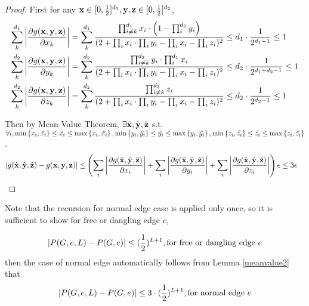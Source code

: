 	\begin{proof}
		First for any ${\bf x} \in [0, \frac{1}{2}]^{d_1} , {\bf y,z} \in [0, \frac{1}{2}]^{d_2}$,
		\begin{align*}
		\sum_k^{d_1} \left\vert \frac{\partial g({\bf x,y,z})}{\partial x_k} \right\vert &= \sum_k^{d_1} \frac{\prod_{i\neq k}^{d_1} x_i \cdot \left( 1 - \prod_i^{d_2} y_i \right)}{(2+\prod_i x_i \cdot \prod_i y_i - \prod_i x_i - \prod_i z_i)^2}
		\leq d_1\cdot  \frac{1}{2^{d_1 - 1}}  \leq 1 \\
		\sum_k^{d_2} \left\vert \frac{\partial g({\bf x,y,z})}{\partial y_k} \right\vert &= \sum_k^{d_2} \frac{\prod_{i\neq k}^{d_2} y_i \cdot \prod_{i}^{d_1} x_i}{(2+\prod_i x_i \cdot \prod_i y_i - \prod_i x_i - \prod_i z_i)^2}
		\leq d_2 \cdot \frac{1}{2^{d_1 + d_2 - 1}} \leq 1 \\
		\sum_k^{d_2} \left\vert \frac{\partial g({\bf x,y,z})}{\partial z_k} \right\vert &= \sum_k^{d_2} \frac{\prod_{i\neq k}^{d_2} z_i }{(2+\prod_i x_i \cdot \prod_i y_i - \prod_i x_i - \prod_i z_i)^2}
		\leq d_2 \cdot \frac{1}{2^{d_2 - 1}} \leq 1
		\end{align*}

		Then by Mean Value Theorem, $\exists \tilde{\bf x}, \tilde{\bf y},  \tilde{\bf z}$ s.t. $\forall i, \min\left\{x_i,\hat{x_i}\right\} \leq \tilde{x_i} \leq \max\left\{x_i, \hat{x_i}\right\}, \min\left\{y_i,\hat{y_i}\right\} \leq \tilde{y_i} \leq \max\left\{y_i, \hat{y_i}\right\}, \min\left\{z_i,\hat{z_i}\right\} \leq \tilde{z_i} \leq \max\left\{z_i, \hat{z_i}\right\}$.
		\begin{align*}
		\left\vert g(\hat{\bf x}, \hat{\bf y}, \hat{\bf z}) - g({\bf x,y,z})\right\vert \leq &
		\left(  \sum_i\left\vert \frac{\partial g(\tilde{\bf x},\tilde{\bf y},\tilde{\bf z} )}{\partial x_i}\right\vert + \sum_i\left\vert \frac{\partial g(\tilde{\bf x},\tilde{\bf y},\tilde{\bf z} )}{\partial y_i}\right\vert +  \sum_i\left\vert \frac{\partial g(\tilde{\bf x},\tilde{\bf y},\tilde{\bf z} )}{\partial z_i}\right\vert \right)  \epsilon
		\leq  3\epsilon
		\end{align*}
	\end{proof}


		Note that the recursion for normal edge case is applied only once, so it is sufficient to show for free or dangling edge $e$,

		\[\left\vert P(G,e,L) - P(G,e)\right\vert \leq (\frac{1}{2})^{L+1}, \textrm{for free or dangling edge $e$}\]
		then the case of normal edge automatically follows from Lemma \ref{meanvalue2} that
		\[\left\vert P(G,e,L) - P(G,e)\right\vert \leq 3\cdot(\frac{1}{2})^{L+1}, \textrm{for normal edge $e$}\]

